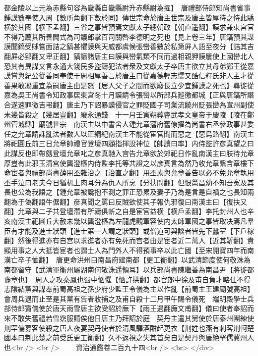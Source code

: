 都金陵以上元為赤縣句容為畿縣自畿縣尉升赤縣尉為擢】　唐禮部侍郎知尚書省事鍾謨數奉使入周【數所角翻下數於同】傳世宗命於唐主世宗及唐主皆厚待之恃此驕横於其國【横下孟翻】三省之事皆預焉文獻太子總朝政【朝直遥翻】謨求兼東宫官不得乃薦其所善閻式為司議郎掌百司關啓李德明之死也【見上卷三年】唐鎬預其謀謨聞鎬受賕嘗面詰之鎬甚懼謨與天威都虞候張巒善數於私第屛人語至夜分【詰其吉翻屛必郢翻又卑正翻】鎬譖諸唐主曰謨與巒氣類不同而過相親狎謨屢使上國巒北人恐其有異謀又言永通大錢民多盗鑄犯法者衆及文獻太子卒唐主欲立其母弟鄭王從嘉謨嘗與紀公從善同奉使于周相厚善言於唐主曰從嘉德輕志懦又酷信釋氏非人主才從善果敢凝重宜為嗣唐主由是怒【居人父子之間而欲廢長立少宜鍾謨之死也】尋徙從嘉為吳王尚書令知政事居東宫冬十月謨請令張巒以所部兵廵徼都城【正與唐鎬所譖合遂速罪徼吉弔翻】唐主乃下詔暴謨侵官之罪貶國子司業流饒州貶張巒為宣州副使未幾皆殺之【幾居豈翻】廢永通錢　十一月壬寅朔葬睿武孝文皇帝于慶陵【陵在鄭州管城縣】廟號世宗　南漢主以中書舍人鍾允章藩府舊僚擢為尚書右丞參政事甚委任之允章請誅亂法者數人以正綱紀南漢主不能從宦官聞而惡之【惡烏路翻】南漢主將祀圓丘前三日允章帥禮官登壇四顧指揮設神位【帥讀曰率】内侍監許彦真望之曰此謀反也即帶劔登壇允章叱之彦真馳入宫告允章欲於郊祀日作亂南漢主曰朕待允章厚豈有此邪玉清宫使龔澄樞内侍監李托等共證之以彦真言為然乃收允章繫含章樓下命宦者與禮部尚書薛用丕雜治之【治直之翻】用丕素與允章善告以必不免允章執用丕手泣曰老夫今日猶机上肉耳分為仇人所烹【分扶問翻】但恨邕昌幼不知吾寃及其長也公為我語之【鍾允章被讒抱不測之罪正恐累及妻子乃為是言是自禍之也長知兩翻為于偽翻語牛倨翻】彦真聞之罵曰反賊欲使其子報仇邪復曰南漢主曰【復扶又翻】允章與二子共登壇濳有所禱俱斬之自是宦官益横【横戶孟翻】李托封州人也辛亥南漢主祀圓丘大赦未幾以龔澄樞為左龍虎觀軍容使内太師軍國之事皆取决焉凡羣臣有才能及進士狀頭【進士第一人謂之狀頭】或僧道可與談者皆先下蠶室【下戶稼翻】然後得進亦有自宫以求進者亦有免死而宫者由是宦者近二萬人【近其靳翻】貴顯用事之人大抵皆宦者也謂士人為門外人不得預事卒以此亡國【至宋開寶四年而南漢亡卒子恤翻】　唐更命洪州曰南昌府建南都【更工衡翻】以武清節度使何敬洙為南都留守【武清軍衡州屬湖南何敬洙遥領耳】以兵部尚書陳繼善為南昌尹【將徙都豫章也】　周人之攻秦鳳也蜀中忷懼【忷許拱翻】都官郎中徐及甫自負才略仕不得志隂結黨與謀奉前蜀高祖之孫少府少監王令儀為主以作亂【前蜀主王建廟號高祖】會周兵退而止至是其黨有告者收捕之及甫自殺十二月甲午賜令儀死　端明殿學士兵部侍郎竇儀使於唐天雨雪唐主欲受詔於廡下【雨王遇翻廡文甫翻】儀曰使者奉詔而來不敢失舊禮若雪霑服請俟他日唐主乃拜詔於庭　契丹主遣其舅使於唐泰州團練使荆罕儒募客使殺之唐人夜宴契丹使者於清風驛酒酣起更衣【荆姓也燕有刺客荆軻楚國本曰荆此楚之前受氏更工衡翻】久不返視之失其首矣自是契丹與唐絶罕儒冀州人也<br />
<br />
　　資治通鑑卷二百九十四<br />
  <br>
   </div> 

